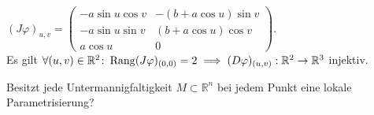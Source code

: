 \documentclass[../main.tex]{subfiles}
\begin{document}
\begin{examples}
\begin{enumerate}
    
    $(J \varphi)_{u,v} = \begin{pmatrix}
    -a \sin u \cos v & -(b+ a \cos u) \sin v \\
    -a \sin u \sin v & (b+ a \cos u) \cos v \\
    a \cos u & 0
    \end{pmatrix}$. \\
    Es gilt $\forall (u,v) \in \mathbb{R}^2 \colon \operatorname{Rang} (J\varphi )_{(0,0)} = 2 \implies (D\varphi )_{(u,v)} : \mathbb{R}^2 \to \mathbb{R}^3$ injektiv.
\end{enumerate}
\end{examples}
\begin{question}
Besitzt jede Untermannigfaltigkeit $M \subset \mathbb{R}^n$ bei jedem Punkt eine lokale Parametrisierung?
\end{question}
\end{document}
